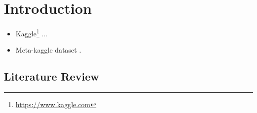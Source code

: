 \documentclass[mnsc]{informs3}
\begin{document}
%



\section{Introduction}

\begin{itemize}
\item Kaggle\footnote{\url{https://www.kaggle.com}} ...
\item Meta-kaggle dataset \cite{megan_risdal_timo_bozsolik_2022}. 
\end{itemize}

\subsection{Literature Review}
\end{document}
